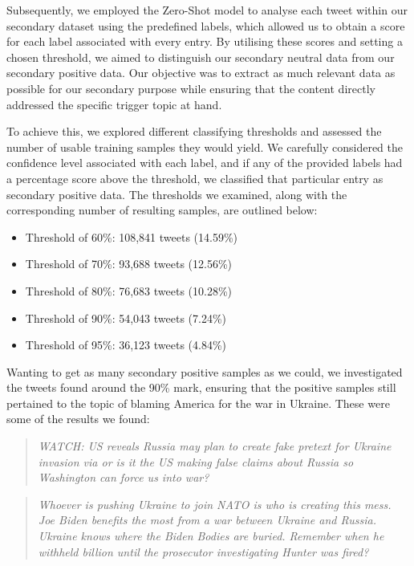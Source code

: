 Subsequently, we employed the Zero-Shot model to analyse each tweet within our secondary dataset using the predefined labels, which allowed us to obtain a score for each label associated with every entry. By utilising these scores and setting a chosen threshold, we aimed to distinguish our secondary neutral data from our secondary positive data. Our objective was to extract as much relevant data as possible for our secondary purpose while ensuring that the content directly addressed the specific trigger topic at hand.

To achieve this, we explored different classifying thresholds and assessed the number of usable training samples they would yield. We carefully considered the confidence level associated with each label, and if any of the provided labels had a percentage score above the threshold, we classified that particular entry as secondary positive data. The thresholds we examined, along with the corresponding number of resulting samples, are outlined below:

\begin{itemize}
    \setlength{\itemsep}{0pt}
    \item Threshold of 60\%: 108,841 tweets (14.59\%)
    \item Threshold of 70\%: 93,688 tweets (12.56\%)
    \item Threshold of 80\%: 76,683 tweets (10.28\%)
    \item Threshold of 90\%: 54,043 tweets (7.24\%)
    \item Threshold of 95\%: 36,123 tweets (4.84\%)
\end{itemize}

Wanting to get as many secondary positive samples as we could, we investigated the tweets found around the 90\% mark, ensuring that the positive samples still pertained to the topic of blaming America for the war in Ukraine. These were some of the results we found:

\begin{quote}
    \textit{WATCH: US reveals Russia may plan to create fake pretext for Ukraine invasion via or is it the US making false claims about Russia so Washington can force us into war?}
\end{quote}

\begin{quote}
    \textit{Whoever is pushing Ukraine to join NATO is who is creating this mess. Joe Biden benefits the most from a war between Ukraine and Russia. Ukraine knows where the Biden Bodies are buried. Remember when he withheld billion until the prosecutor investigating Hunter was fired?}
\end{quote}

